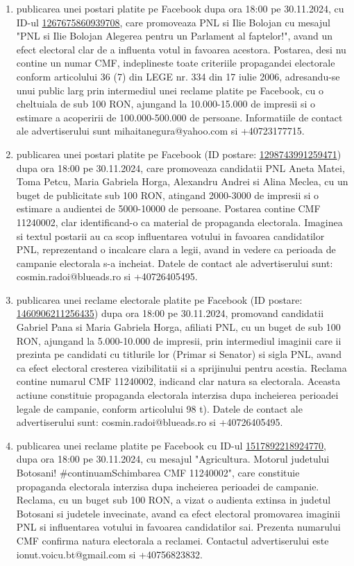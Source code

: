 \documentclass[a4paper,12pt]{article}
\begin{document}
\begin{enumerate}[leftmargin=*, label=\arabic*.)]
    \item publicarea unei postari platite pe Facebook dupa ora 18:00 pe 30.11.2024, cu ID-ul \href{https://www.facebook.com/ads/library/?id=1267675860939708}{1267675860939708}, care promoveaza PNL si Ilie Bolojan cu mesajul "PNL si Ilie Bolojan  Alegerea pentru un Parlament al faptelor!", avand un efect electoral clar de a influenta votul in favoarea acestora. Postarea, desi nu contine un numar CMF, indeplineste toate criteriile propagandei electorale conform articolului 36 (7) din LEGE nr. 334 din 17 iulie 2006, adresandu-se unui public larg prin intermediul unei reclame platite pe Facebook, cu o cheltuiala de sub 100 RON, ajungand la 10.000-15.000 de impresii si o estimare a acoperirii de 100.000-500.000 de persoane.  Informatiile de contact ale advertiserului sunt mihaitanegura@yahoo.com si +40723177715.
    \item publicarea unei postari platite pe Facebook (ID postare: \href{https://www.facebook.com/ads/library/?id=1298743991259471}{1298743991259471}) dupa ora 18:00 pe 30.11.2024, care promoveaza candidatii PNL Aneta Matei, Toma Petcu, Maria Gabriela Horga, Alexandru Andrei si Alina Meclea, cu un buget de publicitate sub 100 RON, atingand 2000-3000 de impresii si o estimare a audientei de 5000-10000 de persoane. Postarea contine CMF 11240002, clar identificand-o ca material de propaganda electorala.  Imaginea si textul postarii au ca scop influentarea votului in favoarea candidatilor PNL, reprezentand o incalcare clara a legii, avand in vedere ca perioada de campanie electorala s-a incheiat.  Datele de contact ale advertiserului sunt: cosmin.radoi@blueads.ro si +40726405495.
    \item publicarea unei reclame electorale platite pe Facebook (ID postare: \href{https://www.facebook.com/ads/library/?id=1460906211256435}{1460906211256435}) dupa ora 18:00 pe 30.11.2024,  promovand candidatii Gabriel Pana si Maria Gabriela Horga,  afiliati PNL, cu un buget de sub 100 RON,  ajungand la 5.000-10.000 de impresii,  prin intermediul imaginii care ii prezinta pe candidati cu titlurile lor (Primar si Senator) si sigla PNL,  avand ca efect electoral cresterea vizibilitatii si a sprijinului pentru acestia.  Reclama contine numarul CMF 11240002, indicand clar natura sa electorala.  Aceasta actiune constituie propaganda electorala interzisa dupa incheierea perioadei legale de campanie, conform articolului 98 t).  Datele de contact ale advertiserului sunt: cosmin.radoi@blueads.ro si +40726405495.
    \item publicarea unei reclame platite pe Facebook cu ID-ul \href{https://www.facebook.com/ads/library/?id=1517892218924770}{1517892218924770}, dupa ora 18:00 pe 30.11.2024,  cu mesajul "Agricultura. Motorul judetului Botosani! \#continuamSchimbarea CMF 11240002",  care constituie propaganda electorala interzisa dupa incheierea perioadei de campanie.  Reclama, cu un buget sub 100 RON, a vizat o audienta extinsa in judetul Botosani si judetele invecinate, avand ca efect electoral promovarea imaginii PNL si influentarea votului in favoarea candidatilor sai. Prezenta numarului CMF confirma natura electorala a reclamei.  Contactul advertiserului este ionut.voicu.bt@gmail.com si +40756823832.

\end{enumerate}
\end{document}
